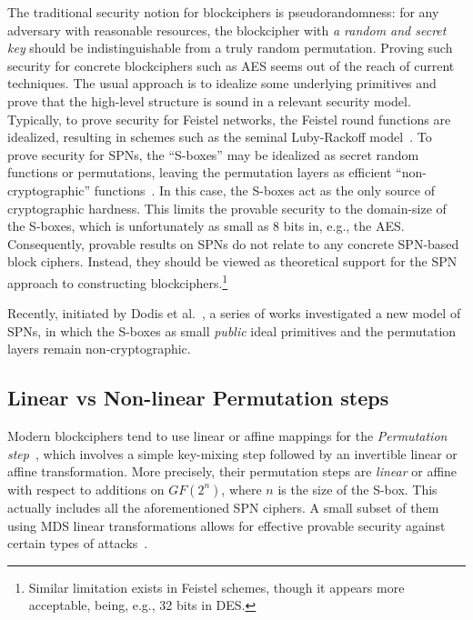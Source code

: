 The traditional security notion for blockciphers is pseudorandomness: for any adversary with reasonable resources, the blockcipher with {\it a random and secret key} should be indistinguishable from a truly random
permutation. Proving such security for concrete blockciphers such as AES
seems out of the reach of current techniques. The usual approach is to idealize some underlying primitives and prove that the
high-level structure is sound in a relevant security model. Typically, to prove security for Feistel networks, the Feistel round functions are idealized, resulting in schemes such as the seminal Luby-Rackoff model~\cite{DBLP:journals/siamcomp/LubyR88,EC:MauPie03,C:patarin03,C:patarin04,C:HoaRog10,JC:CHKPST16}. To prove security for SPNs, the ``S-boxes'' may be idealized as secret random functions or permutations, leaving the permutation layers as efficient ``non-cryptographic'' functions~\cite{FSE:IwaKur00,miles2015substitution}. In this case, the S-boxes act as the only source of cryptographic hardness. This limits the provable security to the domain-size of the S-boxes, which is unfortunately as small as 8 bits in, e.g., the AES. Consequently, provable results on SPNs do not relate to any concrete SPN-based block ciphers. Instead, they should be viewed as theoretical support for the SPN approach to constructing blockciphers.\footnote{Similar limitation exists in Feistel schemes, though it appears more acceptable, being, e.g., 32 bits in DES.}


Recently, initiated by Dodis et al.~\cite{EC:DSSL16,EPRINT:DKSTZ17}, a series of works investigated a new model of SPNs, in which the S-boxes
as small {\it public} ideal primitives and the permutation layers remain non-cryptographic.





\subsection{Linear vs Non-linear Permutation steps}

Modern blockciphers tend to use linear or affine mappings for the {\it Permutation step}~\cite{DBLP:reference/crypt/Biryukov11aa}, which involves a simple key-mixing step followed
by an invertible linear or affine transformation. More precisely, their permutation steps are {\it linear} or affine with respect to additions on $GF(2^n)$, where $n$ is the size of the S-box. This actually includes all the aforementioned SPN ciphers. A small subset of them using MDS linear transformations allows for effective provable security against certain types of attacks~\cite{IMA:DaeRij01,AC:PSCYL02,FSE:PSLL03,miles2015substitution,EC:SLGRL16}.



